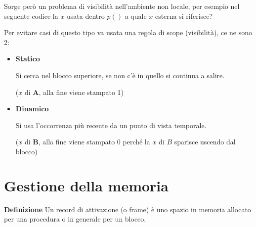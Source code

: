 \documentclass{article}
\newcommand{\df}{\noindent\textbf{Definizione} }
\begin{document}
Sorge però un problema di visibilità nell'ambiente non locale, per esempio nel seguente codice la $x$ usata dentro $p()$ a quale $x$ esterna si riferisce?

\begin{algorithm}

\end{algorithm}

Per evitare casi di questo tipo va usata una regola di scope (visibilità), ce ne sono 2:
\begin{itemize}
    \item \textbf{Statico}

        Si cerca nel blocco superiore, se non c'è in quello si continua a salire. 
        
        ($x$ di \textbf{A}, alla fine viene stampato 1)
    
    \item \textbf{Dinamico}

        Si usa l'occorrenza più recente da un punto di vista temporale. 
        
        ($x$ di \textbf{B}, alla fine viene stampato 0 perché la $x$ di $B$ sparisce uscendo dal blocco)
    
\end{itemize}

\vspace{2pt}

\section{Gestione della memoria}

\df Un record di attivazione (o frame) è uno spazio in memoria allocato per una procedura o in generale per un blocco.\newline
\end{document}
